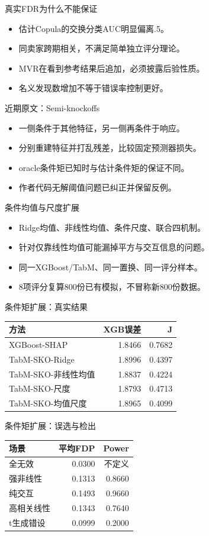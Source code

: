 \documentclass[aspectratio=169]{beamer}
\begin{document}
\begin{frame}{真实FDR为什么不能保证}
\begin{itemize}
\item 估计Copula的交换分类AUC明显偏离.5。
\item 同卖家跨期相关，不满足简单独立评分理论。
\item MVR在看到参考结果后追加，必须披露后验性质。
\item 名义发现数增加不等于错误率控制更好。
\end{itemize}
\end{frame}
\begin{frame}{近期原文：Semi-knockoffs}
\begin{itemize}
\item 一侧条件于其他特征，另一侧再条件于响应。
\item 分别重建特征并打乱残差，比较固定预测器损失。
\item oracle条件矩已知时与估计条件矩的保证不同。
\item 作者代码无解阈值问题已纠正并保留反例。
\end{itemize}
\end{frame}
\begin{frame}{条件均值与尺度扩展}
\begin{itemize}
\item Ridge均值、非线性均值、条件尺度、联合四机制。
\item 针对仅靠线性均值可能漏掉平方与交互信息的问题。
\item 同一XGBoost/TabM、同一置换、同一评分样本。
\item 8项评分复算800份已有模拟，不冒称新800份数据。
\end{itemize}
\end{frame}
\begin{frame}{条件矩扩展：真实结果}
\footnotesize\centering \begin{tabular}{lrr}
\toprule
方法 & XGB误差 & J\\\midrule
XGBoost-SHAP & 1.8466 & 0.7682\\
TabM-SKO-Ridge & 1.8996 & 0.4397\\
TabM-SKO-非线性均值 & 1.8837 & 0.4224\\
TabM-SKO-尺度 & 1.8793 & 0.4713\\
TabM-SKO-均值尺度 & 1.8965 & 0.4099\\
\bottomrule
\end{tabular}
\end{frame}
\begin{frame}{条件矩扩展：误选与检出}
\footnotesize\centering \begin{tabular}{lrr}
\toprule
场景 & 平均FDP & Power\\\midrule
全无效 & 0.0300 & 不定义\\
强非线性 & 0.1313 & 0.8660\\
纯交互 & 0.1493 & 0.9660\\
高相关线性 & 0.1343 & 0.7640\\
t生成错设 & 0.0999 & 0.2000\\
\bottomrule
\end{tabular}
\end{frame}
\end{document}
